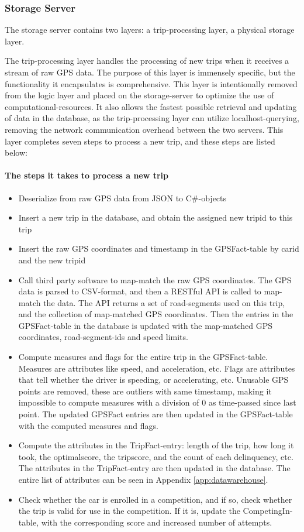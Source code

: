 \subsubsection{Storage Server}\label{subsec:storageserver}
The storage server contains two layers: a trip-processing layer, a physical storage layer.

The trip-processing layer handles the processing of new trips when it receives a stream of raw GPS data. The purpose of this layer is immensely specific, but the functionality it encapsulates is comprehensive. This layer is intentionally removed from the logic layer and placed on the storage-server to optimize the use of computational-resources. It also allows the fastest possible retrieval and updating of data in the database, as the trip-processing layer can utilize localhost-querying, removing the network communication overhead between the two servers. This layer completes seven steps to process a new trip, and these steps are listed below:

\paragraph{The steps it takes to process a new trip}
\begin{itemize}
\item Deserialize from raw GPS data from JSON to C\#-objects
\item Insert a new trip in the database, and obtain the assigned new tripid to this trip
\item Insert the raw GPS coordinates and timestamp in the GPSFact-table by carid and the new tripid
\item Call third party software to map-match the raw GPS coordinates. The GPS data is parsed to CSV-format, and then a RESTful API is called to map-match the data. The API returns a set of road-segments used on this trip, and the collection of map-matched GPS coordinates. Then the entries in the GPSFact-table in the database is updated with the map-matched GPS coordinates, road-segment-ids and speed limits.
\item Compute measures and flags for the entire trip in the GPSFact-table. Measures are attributes like speed, and acceleration, etc. Flags are attributes that tell whether the driver is speeding, or accelerating, etc. Unusable GPS points are removed, these are outliers with same timestamp, making it impossible to compute measures with a division of 0 as time-passed since last point. The updated GPSFact entries are then updated in the GPSFact-table with the computed measures and flags.
\item Compute the attributes in the TripFact-entry: length of the trip, how long it took, the optimalscore, the tripscore, and the count of each delinquency, etc. The attributes in the TripFact-entry are then updated in the database. The entire list of attributes can be seen in Appendix \ref{app:datawarehouse}.
\item Check whether the car is enrolled in a competition, and if so, check whether the trip is valid for use in the competition. If it is, update the CompetingIn-table, with the corresponding score and increased number of attempts. 
\end{itemize}

